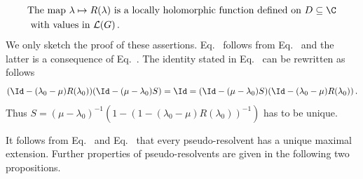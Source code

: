\begin{equation}\label{eq:c3-2.12}
	\begin{split}
	&\text{The map $\lambda \mapsto R(\lambda)$ is a locally holomorphic function defined on  $D \subseteq \C $}\\ 
	&\text{ with values in  $\mathcal{L}(G)$}\,.
	\end{split}
\end{equation}
We only sketch the proof of these assertions. Eq.~ follows from Eq.~ and the latter is a consequence of Eq.~.
The identity stated in Eq.~ can be rewritten as follows
\[
(\Id-(\lambda_{0}-\mu)R(\lambda_{0}))(\Id-(\mu-\lambda_{0})S) = \Id = (\Id-(\mu-\lambda_{0})S)(\Id-(\lambda_{0}-\mu)R(\lambda_{0}))\,.
\]
Thus $S = (\mu-\lambda_{0})^{-1}(1 - (1-(\lambda_{0}-\mu)R(\lambda_{0}))^{-1})$ has to be unique.

It follows from Eq.~ and Eq.~ that every pseudo-resolvent has a unique maximal extension.
Further properties of pseudo-resolvents are given in the following two propositions.

